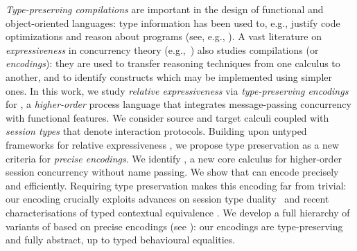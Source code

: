 

\emph{Type-preserving compilations} are important in the design of
functional and object-oriented languages: type information has been
used to, e.g., justify code optimizations and reason about programs
(see, e.g.,
\cite{DBLP:journals/toplas/MorrisettWCG99,DBLP:conf/pldi/ShaoA95,DBLP:journals/toplas/LeagueST02}).
A vast literature on 
{\em expressiveness} 
in concurrency theory  
(e.g.,~\cite{Palamidessi03,DBLP:journals/iandc/Gorla10,DBLP:conf/icalp/LanesePSS10})
also studies compilations (or \emph{encodings}):
they are used to transfer reasoning techniques 
from one calculus to another, and to identify 
constructs which may be implemented
using simpler ones. 
In this work, we study 
{\em relative expressiveness} 
via \emph{type-preserving encodings} for \HOp, a \emph{higher-order} 
process language that integrates message-passing concurrency with functional features.
We consider source and target calculi coupled with \emph{session types} that denote interaction protocols. 
Building upon untyped frameworks for relative expressiveness
\cite{DBLP:journals/iandc/Gorla10}, 
we propose type preservation as a {new criteria} for \emph{precise encodings}.
We identify \HO, a new core calculus for higher-order session concurrency without
name passing. 
We show that \HO can encode \HOp precisely and efficiently. 
Requiring  
type preservation makes
this encoding far from trivial: our encoding crucially exploits advances on
session type duality~\cite{TGC14,DBLP:journals/corr/abs-1202-2086} and recent
characterisations of typed contextual equivalence \cite{characteristic_bis}.
We develop a full hierarchy of variants of \HOp based on 
precise encodings (see ):
our encodings are
type-preserving and fully abstract, up to typed
behavioural equalities. 

